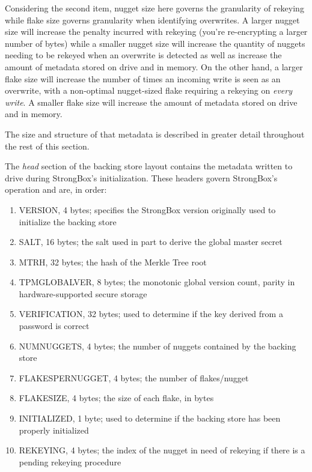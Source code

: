 Considering the second item, nugget size here governs the granularity of
rekeying while flake size governs granularity when identifying overwrites. A
larger nugget size will increase the penalty incurred with rekeying (you're
re-encrypting a larger number of bytes) while a smaller nugget size will increase
the quantity of nuggets needing to be rekeyed when an overwrite is detected as
well as increase the amount of metadata stored on drive and in memory. On the
other hand, a larger flake size will increase the number of times an incoming
write is seen as an overwrite, with a non-optimal nugget-sized flake requiring a
rekeying on \emph{every write}. A smaller flake size will increase the amount of
metadata stored on drive and in memory.

The size and structure of that metadata is described in greater detail
throughout the rest of this section.

The \textit{head} section of the backing store layout contains the metadata
written to drive during StrongBox's initialization. These headers govern
StrongBox's operation and are, in order:

\begin{enumerate}

\item VERSION, 4 bytes; specifies the StrongBox version originally used to
initialize the backing store

\item SALT, 16 bytes; the salt used in part to derive the global master secret

\item MTRH, 32 bytes; the hash of the Merkle Tree root

\item TPMGLOBALVER, 8 bytes; the monotonic global version count, parity in
hardware-supported secure storage

\item VERIFICATION, 32 bytes; used to determine if the key derived from a
password is correct

\item NUMNUGGETS, 4 bytes; the number of nuggets contained by the backing
store

\item FLAKESPERNUGGET, 4 bytes; the number of flakes/nugget

\item FLAKESIZE, 4 bytes; the size of each flake, in bytes

\item INITIALIZED, 1 byte; used to determine if the backing store has been
properly initialized

\item REKEYING, 4 bytes; the index of the nugget in need of rekeying if there
is a pending rekeying procedure

\end{enumerate}

